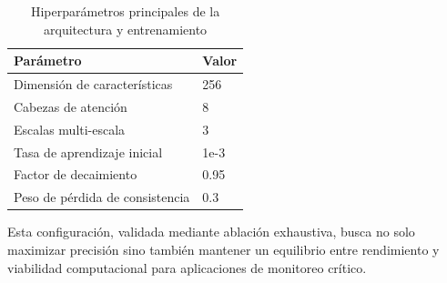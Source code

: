 \begin{table}[h]
\centering
\caption{Hiperparámetros principales de la arquitectura y entrenamiento}
\label{tab:hiperparametros}
\begin{tabular}{ll}
\hline
\textbf{Parámetro} & \textbf{Valor} \\
\hline
Dimensión de características & 256 \\
Cabezas de atención & 8 \\
Escalas multi-escala & 3 \\
Tasa de aprendizaje inicial & 1e-3 \\
Factor de decaimiento & 0.95 \\
Peso de pérdida de consistencia & 0.3 \\
\hline
\end{tabular}
\end{table}

Esta configuración, validada mediante ablación exhaustiva, busca no solo maximizar precisión sino también mantener un equilibrio entre rendimiento y viabilidad computacional para aplicaciones de monitoreo crítico.